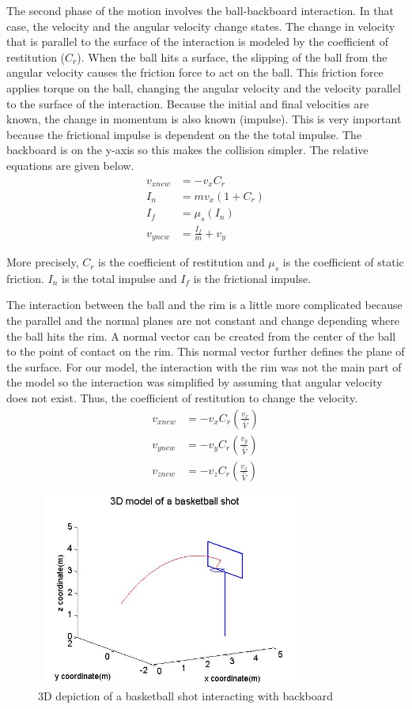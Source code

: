 \documentclass[twocolumn]{IEEEtran}
\begin{document}
The second phase of the motion involves the ball-backboard interaction. In that case, the velocity and the angular velocity change states. The change in velocity that is parallel to the surface of the interaction is modeled by the coefficient of restitution ($C_r$). When the ball hits a surface, the slipping of the ball from the angular velocity causes the friction force to act on the ball. This friction force applies torque on the ball, changing the angular velocity and the velocity parallel to the surface of the interaction. Because the initial and final velocities are known, the change in momentum is also known (impulse). This is very important because the frictional impulse is dependent on the the total impulse. The backboard is on the y-axis so this makes the collision simpler. The relative equations are given below.
\begin{align}
v_{xnew} &= -v_x C_r\\
I_n &= mv_x (1+C_r)\\
I_f &= \mu_s (I_n)\\
v_{ynew} &= \frac{I_f}{m} +v_y
\end{align}

More precisely, $C_r$ is the coefficient of restitution and $\mu_s$ is the coefficient of static friction. $I_n$ is the total impulse and $I_f$ is the frictional impulse. 

The interaction between the ball and the rim is a little more complicated because the parallel and the normal planes are not constant and change depending where the ball hits the rim. A normal vector can be created from the center of the ball to the point of contact on the rim. This normal vector further defines the plane of the surface. For our model, the interaction with the rim was not the main part of the model so the interaction was simplified by assuming that angular velocity does not exist. Thus, the coefficient of restitution to change the velocity.
\begin{align}
v_{xnew} &= -v_x C_r (\frac{v_x}{\hat V})\\
v_{ynew} &= -v_y C_r (\frac{v_y}{\hat{V}})\\
v_{znew} &= -v_z C_r (\frac{v_z}{\hat{V}})
\end{align}

\begin{figure}[!ht]
\includegraphics[height=2.5in,width = 3.5in]{3Dbasketballshot}
\caption{3D depiction of a basketball shot interacting with backboard}
\end{figure}
\end{document}
